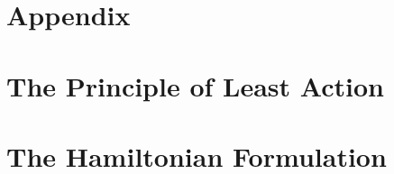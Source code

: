 \documentclass[draft]{agujournal2019}
\begin{document}
\section{Appendix}
\appendix
\section{The Principle of Least Action}
\section{The Hamiltonian Formulation}


%
%

%

%


%
%

\end{document}
